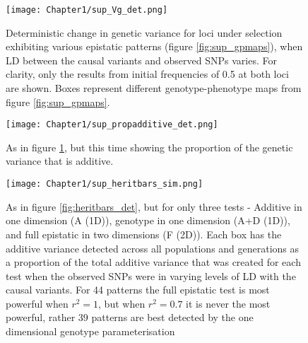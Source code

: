 \begin{figure}
\begin{center}
\texttt{[image: Chapter1/sup\_Vg\_det.png]} \\
\caption[Deterministically calculated change in genetic variance for extended maps]{Deterministic change in genetic variance for loci under selection exhibiting various epistatic patterns (figure \ref{fig:sup_gpmaps}), when LD between the causal variants and observed SNPs varies. For clarity, only the results from initial frequencies of 0.5 at both loci are shown. Boxes represent different genotype-phenotype maps from figure \ref{fig:sup_gpmaps}.}
\label{fig:sup_Vg_det}
\end{center}
\end{figure}

\begin{figure}
\begin{center}
\texttt{[image: Chapter1/sup\_propadditive\_det.png]} \\
\caption[Deterministically calculated change in additive variance for extended maps]{As in figure \ref{fig:sup_Vg_det}, but this time showing the proportion of the genetic variance that is additive.}
\label{fig:sup_propadditive_det}
\end{center}
\end{figure}

\begin{figure}
\begin{center}
\texttt{[image: Chapter1/sup\_heritbars\_sim.png]} \\
\caption[Proportion of additive variance detected for extended maps]{As in figure \ref{fig:heritbars_det}, but for only three tests - Additive in one dimension (A (1D)), genotype in one dimension (A+D (1D)), and full epistatic in two dimensions (F (2D)). Each box has the additive variance detected across all populations and generations as a proportion of the total additive variance that was created for each test when the observed SNPs were in varying levels of LD with the causal variants. For 44 patterns the full epistatic test is most powerful when $r^{2}=1$, but when $r^{2} = 0.7$ it is never the most powerful, rather 39 patterns are best detected by the one dimensional genotype parameterisation}
\label{fig:sup_heritbars_det}
\end{center}
\end{figure}

